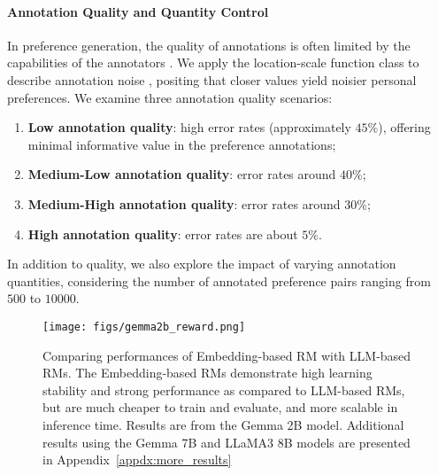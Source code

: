 \paragraph{Annotation Quality and Quantity Control} In preference generation, the quality of annotations is often limited by the capabilities of the annotators \citep{sanderson2010user,stewart2005absolute,guest2016relative,wang2024secrets}. We apply the location-scale function class to describe annotation noise \citep{sun2024rethinking}, positing that closer values yield noisier personal preferences. We examine three annotation quality scenarios: 
\begin{enumerate}[nosep,leftmargin=*] 
\item \textbf{Low annotation quality}: high error rates (approximately $45\%$), offering minimal informative value in the preference annotations; 
\item \textbf{Medium-Low annotation quality}: error rates around $40\%$; 
\item \textbf{Medium-High annotation quality}: error rates around $30\%$; 
\item \textbf{High annotation quality}: error rates are about $5\%$. \end{enumerate}
In addition to quality, we also explore the impact of varying annotation quantities, considering the number of annotated preference pairs ranging from $500$ to $10000$.

\begin{figure*}[t!]
    \centering
    \texttt{[image: figs/gemma2b\_reward.png]}\vspace{-0.35cm}
    \caption{\small  Comparing performances of Embedding-based RM  with LLM-based RMs. The Embedding-based RMs demonstrate high learning stability and strong performance as compared to LLM-based RMs, but are much cheaper to train and evaluate, and more scalable in inference time. Results are from the Gemma 2B model. Additional results using the Gemma 7B and LLaMA3 8B models are presented in Appendix~\ref{appdx:more_results}}
    \label{fig:performance_with_embeddings}\vspace{-0.25cm}
\end{figure*}



